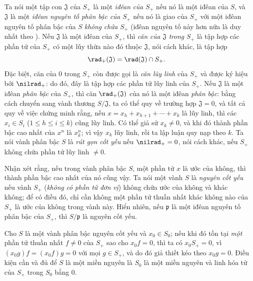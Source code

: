 \documentclass[oneside,10pt]{amsart}
\renewcommand{\leq}{\leqslant}
\let\EGAOriginalLabel\label
\renewcommand{\label}[1]{\phantomsection\EGAOriginalLabel{#1}}
\begin{document}
\begin{env}[2.1.10]
\label{II.2.1.10}
Ta nói một tập con $\mathfrak{J}$ của $S_+$ là một \emph{iđêan của $S_+$} nếu nó là một iđêan của $S$, và $\mathfrak{J}$ là một \emph{iđêan nguyên tố phân bậc của $S_+$} nếu nó là giao của $S_+$ với một iđêan nguyên tố phân bậc của $S$ \emph{không chứa $S_+$} (iđêan nguyên tố này hơn nữa là duy nhất theo ).
Nếu $\mathfrak{J}$ là một iđêan của $S_+$, thì \emph{căn của $\mathfrak{J}$ trong $S_+$} là tập hợp các phần tử của $S_+$ có một lũy thừa nào đó thuộc $\mathfrak{J}$, nói cách khác, là tập hợp
\[
  \rad_+(\mathfrak{J})=\rad(\mathfrak{J})\cap S_+.
\]
Đặc biệt, căn của $0$ trong $S_+$ còn được gọi là \emph{căn lũy linh} của $S_+$ và được ký hiệu bởi $\nilrad_+$: do đó, đây là tập hợp các phần tử lũy linh của $S_+$.
Nếu $\mathfrak{J}$ là một iđêan \emph{phân bậc} của $S_+$, thì căn $\rad_+(\mathfrak{J})$ của nó là một iđêan \emph{phân bậc}: bằng cách chuyển sang vành thương $S/\mathfrak{J}$, ta có thể quy về trường hợp $\mathfrak{J}=0$, và tất cả quy về việc chứng minh rằng, nếu $x=x_h+x_{h+1}+\cdots+x_k$ là lũy linh, thì các $x_i\in S_i$ ($1\leq h\leq i\leq k$) cũng lũy linh.
Có thể giả sử $x_k\neq0$, và khi đó thành phần bậc cao nhất của $x^n$ là $x_k^n$; vì vậy $x_k$ lũy linh, rồi ta lập luận quy nạp theo $k$.
Ta nói vành phân bậc $S$ là \emph{rút gọn cốt yếu} nếu $\nilrad_+=0$, nói cách khác, nếu $S_+$ không chứa phần tử lũy linh $\neq0$.
\end{env}

\begin{env}[2.1.11]
\label{II.2.1.11}
Nhận xét rằng, nếu trong vành phân bậc $S$, một phần tử $x$ là ước của không, thì thành phần bậc cao nhất của nó cũng vậy.
Ta nói một vành $S$ là \emph{nguyên cốt yếu} nếu vành $S_+$ (\emph{không có phần tử đơn vị}) không chứa ước của không và khác không; để có điều đó, chỉ cần không một phần tử thuần nhất khác không nào của $S_+$ là ước của không trong vành này.
Hiển nhiên, nếu $\mathfrak{p}$ là một iđêan nguyên tố phân bậc của $S_+$, thì $S/\mathfrak{p}$ là nguyên cốt yếu.

Cho $S$ là một vành phân bậc nguyên cốt yếu và $x_0\in S_0$; nếu khi đó tồn tại \emph{một} phần tử thuần nhất $f\neq0$ của $S_+$ sao cho $x_0f=0$, thì ta có $x_0S_+=0$, vì $(x_0g)f=(x_0f)g=0$ với mọi $g\in S_+$, và do đó giả thiết kéo theo $x_0g=0$.
Điều kiện cần và đủ để $S$ là một miền nguyên là $S_0$ là một miền nguyên và linh hóa tử của $S_+$ trong $S_0$ bằng $0$.
\end{env}
\end{document}

